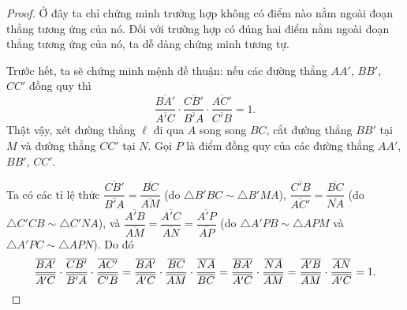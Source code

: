 \documentclass{article} %
\begin{document}
        \begin{proof}
            Ở đây ta chỉ chứng minh trường hợp không có điểm nào nằm ngoài đoạn thẳng tương ứng của nó. Đối với trường hợp có đúng hai điểm nằm ngoài đoạn thẳng tương ứng của nó, ta dễ dàng chứng minh tương tự.
            
            Trước hết, ta sẽ chứng minh mệnh đề thuận: nếu các đường thẳng \(AA'\), \(BB'\), \(CC'\) đồng quy thì
            \[\frac{\overline{BA'}}{\overline{A'C}} \cdot \frac{\overline{CB'}}{\overline{B'A}} \cdot \frac{\overline{AC'}}{\overline{C'B}} = 1.\]
            Thật vậy, xét đường thẳng \(\ell\) đi qua \(A\) song song \(BC\), cắt đường thẳng \(BB'\) tại \(M\) và đường thẳng \(CC'\) tại \(N\). Gọi \(P\) là điểm đồng quy của các đường thẳng \(AA'\), \(BB'\), \(CC'\).

            Ta có các tỉ lệ thức
            \(\dfrac{\overline{CB'}}{\overline{B'A}} = \dfrac{\overline{BC}}{\overline{AM}}\) (do \(\triangle B'BC \sim \triangle B'MA\)),
            \(\dfrac{\overline{C'B}}{\overline{AC'}} = \dfrac{\overline{BC}}{\overline{NA}}\) (do \(\triangle C'CB \sim \triangle C'NA\)),
            và \(\dfrac{\overline{A'B}}{\overline{AM}} = \dfrac{\overline{A'C}}{\overline{AN}} = \dfrac{\overline{A'P}}{\overline{AP}}\) (do \(\triangle A'PB \sim \triangle APM\) và \(\triangle A'PC \sim \triangle APN\)). Do đó
            \[
            \frac{\overline{BA'}}{\overline{A'C}} \cdot \frac{\overline{CB'}}{\overline{B'A}} \cdot \frac{\overline{AC'}}{\overline{C'B}}
            = \frac{\overline{BA'}}{\overline{A'C}} \cdot \frac{\overline{BC}}{\overline{AM}} \cdot \frac{\overline{NA}}{\overline{BC}} \\
            = \frac{\overline{BA'}}{\overline{A'C}} \cdot \frac{\overline{NA}}{\overline{AM}} 
            = \frac{\overline{A'B}}{\overline{AM}} \cdot \frac{\overline{AN}}{\overline{A'C}} = 1.
            \]


\end{proof}
\end{document}
